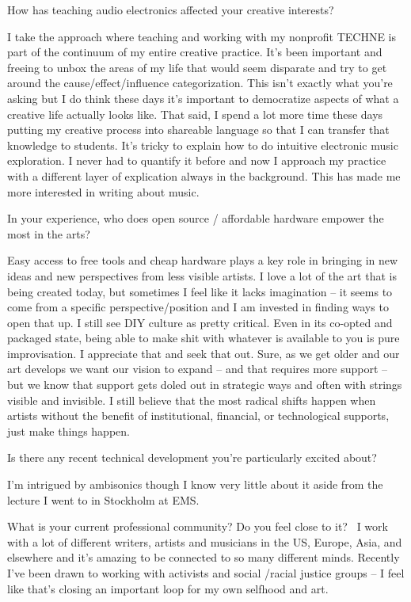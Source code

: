 How has teaching audio electronics affected your creative interests?

I take the approach where teaching and working with my nonprofit TECHNE is part of the continuum of my entire creative practice. It’s been important and freeing to unbox the areas of my life that would seem disparate and try to get around the cause/effect/influence categorization. This isn’t exactly what you’re asking but I do think these days it’s important to democratize aspects of what a creative life actually looks like. That said, I spend a lot more time these days putting my creative process into shareable language so that I can transfer that knowledge to students. It’s tricky to explain how to do intuitive electronic music exploration. I never had to quantify it before and now I approach my practice with a different layer of explication always in the background. This has made me more interested in writing about music. 

In your experience, who does open source / affordable hardware empower the most in the arts?

Easy access to free tools and cheap hardware plays a key role in bringing in new ideas and new perspectives from less visible artists. I love a lot of the art that is being created today, but sometimes I feel like it lacks imagination – it seems to come from a specific perspective/position and I am invested in finding ways to open that up.  
I still see DIY culture as pretty critical. Even in its co-opted and packaged state, being able to make shit with whatever is available to you is pure improvisation. I appreciate that and seek that out. Sure, as we get older and our art develops we want our vision to expand – and that requires more support – but we know that support gets doled out in strategic ways and often with strings visible and invisible. I still believe that the most radical shifts happen when artists without the benefit of institutional, financial, or technological supports, just make things happen.  

Is there any recent technical development you're particularly excited about? 

I’m intrigued by ambisonics though I know very little about it aside from the lecture I went to in Stockholm at EMS. 

What is your current professional community? Do you feel close to it? 
I work with a lot of different writers, artists and musicians in the US, Europe, Asia, and elsewhere and it’s amazing to be connected to so many different minds. Recently I’ve been drawn to working with activists and social /racial justice groups – I feel like that’s closing an important loop for my own selfhood and art. 

